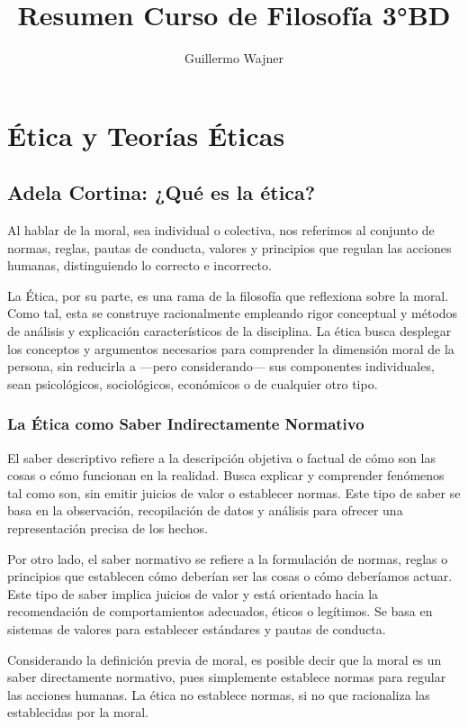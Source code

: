 \documentclass{article}
\title{Resumen Curso de Filosofía 3°BD}
\author{Guillermo Wajner}
\begin{document}
\maketitle

\section{Ética y Teorías Éticas}


\subsection{Adela Cortina: ¿Qué es la ética?}

Al hablar de la moral, sea individual o colectiva, nos referimos al conjunto de normas, reglas, pautas de conducta, valores y principios que regulan las acciones humanas, distinguiendo lo correcto e incorrecto.

La Ética, por su parte, es una rama de la filosofía que reflexiona sobre la moral. Como tal, esta se construye racionalmente empleando rigor conceptual y métodos de análisis y explicación característicos de la disciplina. La ética busca desplegar los conceptos y argumentos necesarios para comprender la dimensión moral de la persona, sin reducirla a ---pero considerando--- sus componentes individuales, sean psicológicos, sociológicos, económicos o de cualquier otro tipo.



\subsubsection{La Ética como Saber Indirectamente Normativo}

El saber descriptivo refiere a la descripción objetiva o factual de cómo son las cosas o cómo funcionan en la realidad. Busca explicar y comprender fenómenos tal como son, sin emitir juicios de valor o establecer normas. Este tipo de saber se basa en la observación, recopilación de datos y análisis para ofrecer una representación precisa de los hechos.

Por otro lado, el saber normativo se refiere a la formulación de normas, reglas o principios que establecen cómo deberían ser las cosas o cómo deberíamos actuar. Este tipo de saber implica juicios de valor y está orientado hacia la recomendación de comportamientos adecuados, éticos o legítimos. Se basa en sistemas de valores para establecer estándares y pautas de conducta.

Considerando la definición previa de moral, es posible decir que la moral es un saber directamente normativo, pues simplemente establece normas para regular las acciones humanas. La ética no establece normas, si no que racionaliza las establecidas por la moral. 
\end{document}
